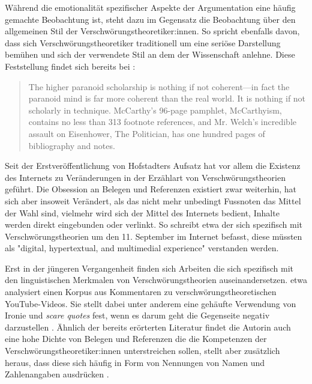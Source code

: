 Während die emotionalität spezifischer Aspekte der Argumentation eine häufig gemachte Beobachtung ist, steht dazu im Gegensatz die Beobachtung über den allgemeinen Stil der Verschwörungstheoretiker:innen.
So spricht ebenfalls \textcite[][61]{butter_2018} davon, dass sich Verschwörungstheoretiker traditionell um eine seriöse Darstellung bemühen und sich der verwendete Stil an dem der Wissenschaft anlehne.
Diese Feststellung findet sich bereits bei \textcite{hofstadter_2008}:

\begin{quotation}
    The higher paranoid scholarship is nothing if not coherent—in fact the paranoid mind is far more coherent than the real world. It is nothing if not scholarly in technique. McCarthy’s 96-page pamphlet, McCarthyism, contains no less than 313 footnote references, and Mr. Welch’s incredible assault on Eisenhower, The Politician, has one hundred pages of bibliography and notes. \parencite[][37]{hofstadter_2008}
\end{quotation}

Seit der Erstveröffentlichung von Hofstadters Aufsatz hat vor allem die Existenz des Internets zu Veränderungen in der Erzählart von Verschwörungstheorien geführt.
Die Obsession an Belegen und Referenzen existiert zwar weiterhin, hat sich aber insoweit Verändert, als das nicht mehr unbedingt Fussnoten das Mittel der Wahl sind, vielmehr wird sich der Mittel des Internets bedient, Inhalte werden direkt eingebunden oder verlinkt.
So schreibt etwa \textcite{soukup_2008} der sich spezifisch mit Verschwörungstheorien um den 11. September im Internet befasst, diese müssten als "digital, hypertextual, and multimedial experience" \parencite[10]{soukup_2008} verstanden werden.

Erst in der jüngeren Vergangenheit finden sich Arbeiten die sich spezifisch mit den linguistischen Merkmalen von Verschwörungstheorien auseinandersetzen.
\textcite{schafer_2018} etwa analysiert einen Korpus aus Kommentaren zu verschwörungstheoretischen YouTube-Videos.
Sie stellt dabei unter anderem eine gehäufte Verwendung von Ironie und \textit{scare quotes} fest, wenn es darum geht die Gegenseite negativ darzustellen \parencite[235]{schafer_2018}.
Ähnlich der bereits erörterten Literatur findet die Autorin auch eine hohe Dichte von Belegen und Referenzen die die Kompetenzen der Verschwörungstheoretiker:innen unterstreichen sollen, stellt aber zusätzlich heraus, dass diese sich häufig in Form von Nennungen von Namen und Zahlenangaben ausdrücken \parencite[234]{schafer_2018}.

